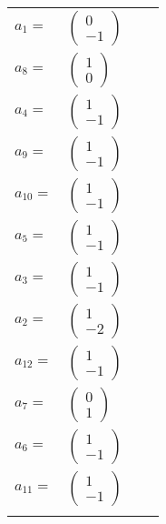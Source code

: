 \documentclass[1p]{elsarticle_modified}
\theoremstyle{definition}
\begin{document}
\begin{tabular}{m{7pt} m{180pt} m{7pt} m{180pt} }
\flushright $a_{1}=$&$\begin{pmatrix}0\\-1\end{pmatrix}$ \\
\flushright $a_{8}=$&$\begin{pmatrix}1\\0\end{pmatrix}$ \\
\flushright $a_{4}=$&$\begin{pmatrix}1\\-1\end{pmatrix}$ \\
\flushright $a_{9}=$&$\begin{pmatrix}1\\-1\end{pmatrix}$ \\
\flushright $a_{10}=$&$\begin{pmatrix}1\\-1\end{pmatrix}$ \\
\flushright $a_{5}=$&$\begin{pmatrix}1\\-1\end{pmatrix}$ \\
\flushright $a_{3}=$&$\begin{pmatrix}1\\-1\end{pmatrix}$ \\
\flushright $a_{2}=$&$\begin{pmatrix}1\\-2\end{pmatrix}$ \\
\flushright $a_{12}=$&$\begin{pmatrix}1\\-1\end{pmatrix}$ \\
\flushright $a_{7}=$&$\begin{pmatrix}0\\1\end{pmatrix}$ \\
\flushright $a_{6}=$&$\begin{pmatrix}1\\-1\end{pmatrix}$ \\
\flushright $a_{11}=$&$\begin{pmatrix}1\\-1\end{pmatrix}$\\&\end{tabular}
\end{document}
